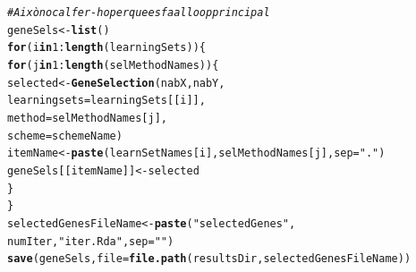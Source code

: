 \documentclass{article}\usepackage[]{graphicx}\usepackage[]{color}
\makeatletter
\newcommand{\hlnum}[1]{\textcolor[rgb]{0.686,0.059,0.569}{#1}}%
\newcommand{\hlstr}[1]{\textcolor[rgb]{0.192,0.494,0.8}{#1}}%
\newcommand{\hlcom}[1]{\textcolor[rgb]{0.678,0.584,0.686}{\textit{#1}}}%
\newcommand{\hlopt}[1]{\textcolor[rgb]{0,0,0}{#1}}%
\newcommand{\hlstd}[1]{\textcolor[rgb]{0.345,0.345,0.345}{#1}}%
\newcommand{\hlkwa}[1]{\textcolor[rgb]{0.161,0.373,0.58}{\textbf{#1}}}%
\newcommand{\hlkwb}[1]{\textcolor[rgb]{0.69,0.353,0.396}{#1}}%
\newcommand{\hlkwc}[1]{\textcolor[rgb]{0.333,0.667,0.333}{#1}}%
\newcommand{\hlkwd}[1]{\textcolor[rgb]{0.737,0.353,0.396}{\textbf{#1}}}%
\newenvironment{kframe}{%
 \def\at@end@of@kframe{}%
 \ifinner\ifhmode%
  \def\at@end@of@kframe{\end{minipage}}%
  \begin{minipage}{\columnwidth}%
 \fi\fi%
 \def\FrameCommand##1{\hskip\@totalleftmargin \hskip-\fboxsep
 \colorbox{shadecolor}{##1}\hskip-\fboxsep
     \hskip-\linewidth \hskip-\@totalleftmargin \hskip\columnwidth}%
 \MakeFramed {\advance\hsize-\width
   \@totalleftmargin\z@ \linewidth\hsize
   \@setminipage}}%
 {\par\unskip\endMakeFramed%
 \at@end@of@kframe}
\newenvironment{knitrout}{}{} %
\makeatother
\begin{document}
\begin{knitrout}
\color{fgcolor}\begin{kframe}
\begin{alltt}
\hlcom{# Això no cal fer-ho perque es fa al loop principal}
\hlstd{geneSels}\hlkwb{<-} \hlkwd{list}\hlstd{()}
\hlkwa{for} \hlstd{(i} \hlkwa{in} \hlnum{1}\hlopt{:}\hlkwd{length}\hlstd{(learningSets))\{}
  \hlkwa{for} \hlstd{(j} \hlkwa{in} \hlnum{1}\hlopt{:}\hlkwd{length}\hlstd{(selMethodNames))\{}
    \hlstd{selected}  \hlkwb{<-} \hlkwd{GeneSelection}\hlstd{(nabX, nabY,}
                               \hlkwc{learningsets} \hlstd{= learningSets[[i]],}
                               \hlkwc{method} \hlstd{= selMethodNames[j],}
                               \hlkwc{scheme}\hlstd{=schemeName)}
    \hlstd{itemName}\hlkwb{<-} \hlkwd{paste}\hlstd{(learnSetNames[i], selMethodNames[j],} \hlkwc{sep}\hlstd{=}\hlstr{"."}\hlstd{)}
    \hlstd{geneSels[[itemName]]}\hlkwb{<-}\hlstd{selected}
  \hlstd{\}}
\hlstd{\}}
\hlstd{selectedGenesFileName} \hlkwb{<-} \hlkwd{paste}\hlstd{(}\hlstr{"selectedGenes"}\hlstd{,}
                               \hlstd{numIter,}\hlstr{"iter.Rda"}\hlstd{,} \hlkwc{sep}\hlstd{=}\hlstr{""}\hlstd{)}
\hlkwd{save}\hlstd{(geneSels,} \hlkwc{file}\hlstd{=}\hlkwd{file.path}\hlstd{(resultsDir,selectedGenesFileName))}
\end{alltt}
\end{kframe}
\end{knitrout}
\end{document}
